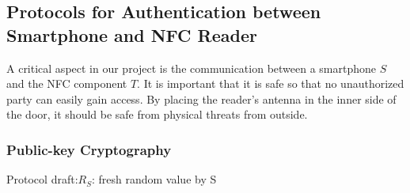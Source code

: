 \subsection{Protocols for Authentication between Smartphone and NFC Reader}
A critical aspect in our project is the communication between a smartphone $ S $ and the NFC component $ T $.
It is important that it is safe so that no unauthorized party can easily gain access.
By placing the reader's antenna in the inner side of the door, it should be safe from physical threats from outside.

\subsubsection{Public-key Cryptography}

Protocol draft:$ R_S $: fresh random value by S

